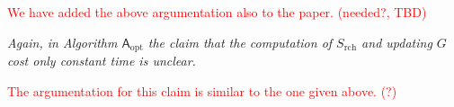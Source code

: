 \documentclass{article}
\let\quoteOld\quote
\let\endquoteOld\endquote
\renewenvironment{quote}{\quoteOld\itshape}{\endquoteOld}
\begin{document}
\textcolor{red}{We have added the above argumentation also to the
  paper. (needed?, TBD)}

\begin{quote}
  Again, in Algorithm $\mathsf{A}_\text{opt}$ the claim that the
  computation of $S_\text{rch}$ and updating $G$ cost only constant
  time is unclear.
\end{quote}

\textcolor{red}{The argumentation for this claim is similar to the one
  given above. (?)}



\end{document}
